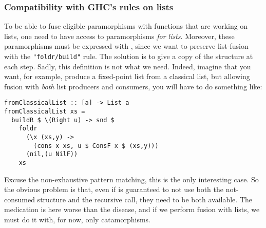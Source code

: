 \subsubsection{Compatibility with GHC's rules on lists}
\label{sec:parabuild}
To be able to fuse eligible paramorphisms with functions that are working on lists, one need to have access to paramorphisms \emph{for lists}. Moreover, these paramorphisms must be expressed with , since we want to preserve list-fusion with the \verb|"foldr/build"| rule. The solution is to give a copy of the structure at each step. Sadly, this definition is not what we need. Indeed, imagine that you want, for example, produce a fixed-point list from a classical list, but allowing fusion with \emph{both} list producers and  consumers, you will have to do something like:
\begin{verbatim}
fromClassicalList :: [a] -> List a
fromClassicalList xs =
  buildR $ \(Right u) -> snd $
    foldr
      (\x (xs,y) ->
        (cons x xs, u $ ConsF x $ (xs,y)))
      (nil,(u NilF))
    xs
\end{verbatim}
Excuse the non-exhaustive pattern matching, this is the only interesting case. So the obvious problem is that, even if  is guaranteed to not use both the not-consumed structure and the recursive call, they need to be both available. The medication is here worse than the disease, and if we perform fusion with lists, we must do it with, for now, only catamorphisms.

